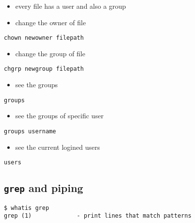 \documentclass[
]{article}
\providecommand{\tightlist}{%
  \setlength{\itemsep}{0pt}\setlength{\parskip}{0pt}}
\begin{document}
\begin{itemize}
\item
  every file has a user and also a group
\item
  change the owner of file
\end{itemize}

\begin{verbatim}
chown newowner filepath
\end{verbatim}

\begin{itemize}
\tightlist
\item
  change the group of file
\end{itemize}

\begin{verbatim}
chgrp newgroup filepath
\end{verbatim}

\begin{itemize}
\tightlist
\item
  see the groups
\end{itemize}

\begin{verbatim}
groups
\end{verbatim}

\begin{itemize}
\tightlist
\item
  see the groups of specific user
\end{itemize}

\begin{verbatim}
groups username
\end{verbatim}

\begin{itemize}
\tightlist
\item
  see the current logined users
\end{itemize}

\begin{verbatim}
users
\end{verbatim}

\hypertarget{grep-and-piping}{%
\subsection{\texorpdfstring{\texttt{grep} and
piping}{grep and piping}}\label{grep-and-piping}}

\begin{verbatim}
$ whatis grep
grep (1)             - print lines that match patterns
\end{verbatim}
\end{document}
